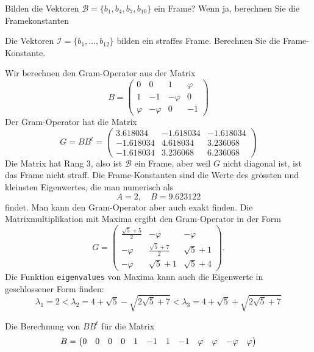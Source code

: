 \begin{teilaufgaben}
\item
Bilden die Vektoren $\mathcal{B}=\{b_1,b_4,b_7,b_{10}\}$ ein Frame?
Wenn ja, berechnen Sie die Framekonstanten
\item
Die Vektoren $\mathcal{I}=\{b_1,\dots,b_{12}\}$ bilden ein straffes
Frame.
Berechnen Sie die Frame-Konstante.
\end{teilaufgaben}

\begin{loesung}
\begin{teilaufgaben}
\item
Wir berechnen den Gram-Operator aus der Matrix
\[
B=\begin{pmatrix}
      0&       0&       1& \varphi\\
      1&-      1&-\varphi&       0\\
\varphi&-\varphi&       0&-      1
\end{pmatrix}
\]
Der Gram-Operator hat die Matrix
\[
G
=
BB^t
=
\begin{pmatrix}
   3.618034& -1.618034&-1.618034\\
  -1.618034&  4.618034& 3.236068\\
  -1.618034&  3.236068& 6.236068
\end{pmatrix}
\]
Die Matrix hat Rang $3$, also ist $\mathcal{B}$ ein Frame, aber
weil $G$ nicht diagonal ist, ist das Frame nicht straff.
Die Frame-Konstanten sind die Werte des grössten und kleinsten Eigenwertes,
die man numerisch als
\[
A=2,\quad B=9.623122
\]
findet.
Man kann den Gram-Operator aber auch exakt finden.
Die Matrixmultiplikation mit Maxima ergibt den Gram-Operator in der
Form
\[
G=\begin{pmatrix}
\frac{\sqrt{5}+5}2 & -\varphi           & -\varphi    \\
-\varphi           & \frac{\sqrt{5}+7}2 & \sqrt{5} + 1\\
-\varphi           & \sqrt{5}+1         & \sqrt{5} + 4
\end{pmatrix}.
\]
Die Funktion \texttt{eigenvalues} von Maxima kann auch die Eigenwerte
in geschlossener Form finden:
\[
\lambda_1
=
2
<
\lambda_2
=
4+\sqrt{5} - \sqrt{2\sqrt{5}+7}
<
\lambda_3
=
4+\sqrt{5} + \sqrt{2\sqrt{5}+7}
\]
\item
Die Berechnung von $BB^t$ für die Matrix
\[
\setcounter{MaxMatrixCols}{12}
B=\begin{pmatrix}
      0&      0&       0&      0&
      1&     -1&       1&     -1&
\varphi&\varphi&-\varphi&\varphi
\\

\end{pmatrix}\]
\end{teilaufgaben}
\end{loesung}
